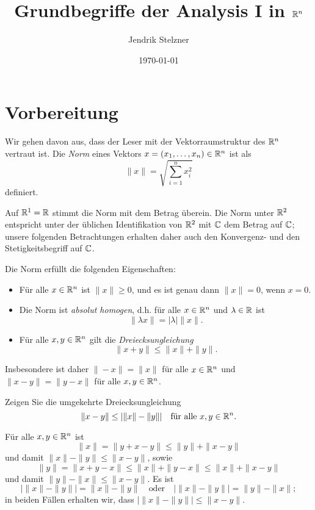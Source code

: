 \documentclass[a4paper,10pt]{article}
\title{Grundbegriffe der Analysis I in $\mathbb{R}^n$}
\author{Jendrik Stelzner}
\date{\today}
\begin{document}
\maketitle


\tableofcontents





\section{Vorbereitung}


Wir gehen davon aus, dass der Leser mit der Vektorraumstruktur des $\mathbb{R}^n$ vertraut ist. Die \emph{Norm} eines Vektors $x = (x_1, \dotsc, x_n) \in \mathbb{R}^n$ ist als
\[
 \|x\| = \sqrt{\sum_{i=1}^n x_i^2}
\]
definiert.

Auf $\mathbb{R}^1 = \mathbb{R}$ stimmt die Norm mit dem Betrag überein. Die Norm unter $\mathbb{R}^2$ entspricht unter der üblichen Identifikation von $\mathbb{R}^2$ mit $\mathbb{C}$ dem Betrag auf $\mathbb{C}$; unsere folgenden Betrachtungen erhalten daher auch den Konvergenz- und den Stetigkeitsbegriff auf $\mathbb{C}$.

Die Norm erfüllt die folgenden Eigenschaften:
\begin{itemize}
 \item
  Für alle $x \in \mathbb{R}^n$ ist $\|x\| \geq 0$, und es ist genau dann $\|x\| = 0$, wenn $x = 0$.
 \item
  Die Norm ist \emph{absolut homogen}, d.h. für alle $x \in \mathbb{R}^n$ und $\lambda \in \mathbb{R}$ ist
  \[
   \|\lambda x\| = |\lambda| \|x\|.
  \]
 \item
  Für alle $x,y \in \mathbb{R}^n$ gilt die \emph{Dreiecksungleichung}
  \[
   \|x+y\| \leq \|x\| + \|y\|.
  \]
\end{itemize}


Insbesondere ist daher $\|-x\| = \|x\|$ für alle $x \in \mathbb{R}^n$ und $\|x-y\| = \|y-x\|$ für alle $x, y \in \mathbb{R}^n$.


\begin{question}
 Zeigen Sie die umgekehrte Dreiecksungleichung
 \[
  \|x-y\| \leq |\|x\|-\|y\|| \quad \text{für alle $x,y \in \mathbb{R}^n$}.
 \]
\end{question}
\begin{solution}
 Für alle $x,y \in \mathbb{R}^n$ ist
 \[
  \|x\| = \|y+x-y\| \leq \|y\| + \|x-y\|
 \]
 und damit $\|x\|-\|y\| \leq \|x-y\|$, sowie
 \[
  \|y\| = \|x+y-x\| \leq \|x\| + \|y-x\| \leq \|x\| + \|x-y\|
 \]
 und damit $\|y\|-\|x\| \leq \|x-y\|$. Es ist
 \[
  |\|x\|-\|y\|| = \|x\|-\|y\|
  \quad
  \text{oder}
  \quad
  |\|x\|-\|y\|| = \|y\|-\|x\|;
 \]
 in beiden Fällen erhalten wir, dass $|\|x\|-\|y\|| \leq \|x-y\|$.
\end{solution}
\end{document}

